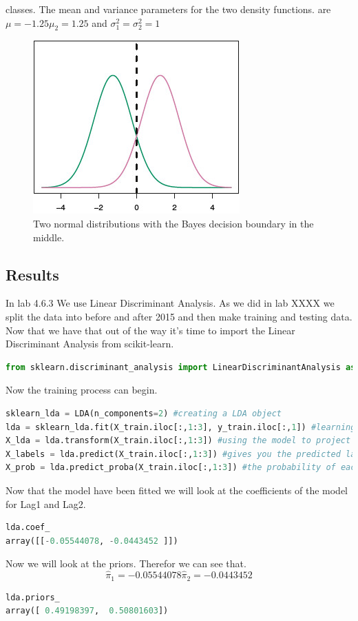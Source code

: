 classes. The mean and variance parameters for the two density functions. 
are $\mu=-1.25 \mu_2=1.25$ and $\sigma^2_1=\sigma^2_2=1$
\begin{figure}[h]
	\centering
	\includegraphics[scale=1.0]{discriminantAnalysis/linearDiscriminantAnalysis/fig/TwoOneDimensionalNormalDensityFunctions.jpg}
	\caption{Two normal distributions with the Bayes decision boundary in the middle.}
	\label{fig:TwoOneDimensionalNormalDensityFunctions}
\end{figure}
\subsection{Results}
In lab 4.6.3 We use Linear Discriminant Analysis. As we did in lab XXXX we split the data into before and after 2015 and then make training and testing data. Now that we have that out of the way it's time to import the Linear Discriminant Analysis from scikit-learn.
\begin{lstlisting}[language=Python]
from sklearn.discriminant_analysis import LinearDiscriminantAnalysis as LDA
\end{lstlisting}
Now the training process can begin.
\begin{lstlisting}[language=Python]
sklearn_lda = LDA(n_components=2) #creating a LDA object
lda = sklearn_lda.fit(X_train.iloc[:,1:3], y_train.iloc[:,1]) #learning the projection matrix
X_lda = lda.transform(X_train.iloc[:,1:3]) #using the model to project X. Project data to maximize class separation.
X_labels = lda.predict(X_train.iloc[:,1:3]) #gives you the predicted label for each sample
X_prob = lda.predict_proba(X_train.iloc[:,1:3]) #the probability of each sample to belong to each class
\end{lstlisting}
Now that the model have been fitted we will look at the coefficients of the model for Lag1 and Lag2.
\begin{lstlisting}[language=Python]
lda.coef_
array([[-0.05544078, -0.0443452 ]])
\end{lstlisting}
Now we will look at the priors. Therefor we can see that. $$ \hat{ \pi }_1 = -0.05544078  \hat{ \pi }_2 = -0.0443452 $$ 
\begin{lstlisting}[language=Python]
lda.priors_
array([ 0.49198397,  0.50801603])
\end{lstlisting}

